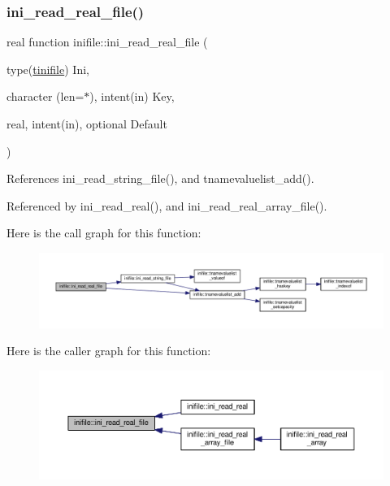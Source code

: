 \subsubsection{\texorpdfstring{ini\+\_\+read\+\_\+real\+\_\+file()}{ini\_read\_real\_file()}}
{\footnotesize\ttfamily real function inifile\+::ini\+\_\+read\+\_\+real\+\_\+file (\begin{DoxyParamCaption}\item[{type(\mbox{\hyperlink{structinifile_1_1tinifile}{tinifile}})}]{Ini,  }\item[{character (len=$\ast$), intent(in)}]{Key,  }\item[{real, intent(in), optional}]{Default }\end{DoxyParamCaption})}



References ini\+\_\+read\+\_\+string\+\_\+file(), and tnamevaluelist\+\_\+add().



Referenced by ini\+\_\+read\+\_\+real(), and ini\+\_\+read\+\_\+real\+\_\+array\+\_\+file().

Here is the call graph for this function\+:
\nopagebreak
\begin{figure}[H]
\begin{center}
\leavevmode
\includegraphics[width=350pt]{namespaceinifile_a307d88edca7f1673a935f6c87c304019_cgraph}
\end{center}
\end{figure}
Here is the caller graph for this function\+:
\nopagebreak
\begin{figure}[H]
\begin{center}
\leavevmode
\includegraphics[width=350pt]{namespaceinifile_a307d88edca7f1673a935f6c87c304019_icgraph}
\end{center}
\end{figure}
\mbox{\label{namespaceinifile_a3e13a763ec2647b0a011c509a529ffbf}} 
